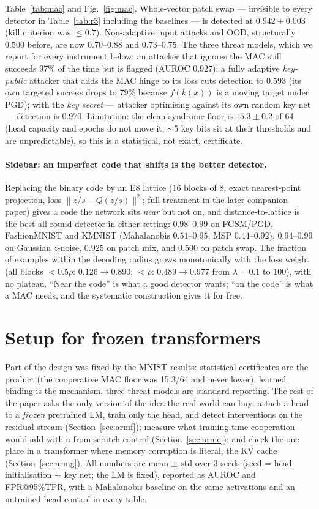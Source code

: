 \documentclass[10pt,twocolumn]{article}
\begin{document}
Table~\ref{tab:mac} and Fig.~\ref{fig:mac}. Whole-vector patch swap --- invisible to
every detector in Table~\ref{tab:r3} including the baselines --- is detected at
$0.942\pm0.003$ (kill criterion was $\le0.7$). Non-adaptive input attacks and OOD,
structurally $0.500$ before, are now $0.70$--$0.88$ and $0.73$--$0.75$. The three
threat models, which we report for every instrument below: an attacker that ignores
the MAC still succeeds 97\% of the time but is flagged (AUROC $0.927$); a fully
adaptive \emph{key-public} attacker that adds the MAC hinge to its loss cuts detection
to $0.593$ (its own targeted success drops to 79\% because $f(k(x))$ is a moving target
under PGD); with the \emph{key secret} --- attacker optimising against its own random
key net --- detection is $0.970$. Limitation: the clean syndrome floor is
$15.3\pm0.2$ of 64 (head capacity and epochs do not move it; $\sim$5 key bits sit at
their thresholds and are unpredictable), so this is a statistical, not exact,
certificate.

\paragraph{Sidebar: an imperfect code that shifts is the better detector.} Replacing
the binary code by an E8 lattice (16 blocks of 8, exact nearest-point projection,
loss $\|z/s-Q(z/s)\|^2$; full treatment in the later companion paper) gives a code the network
sits \emph{near} but not on, and distance-to-lattice is the best all-round detector
in either setting: $0.98$--$0.99$ on FGSM/PGD, FashionMNIST and KMNIST (Mahalanobis
$0.51$--$0.95$, MSP $0.44$--$0.92$), $0.94$--$0.99$ on Gaussian $z$-noise, $0.925$ on
patch mix, and $0.500$ on patch swap. The fraction of examples within the decoding
radius grows monotonically with the loss weight (all blocks $<0.5\rho$: $0.126\to0.890$;
$<\rho$: $0.489\to0.977$ from $\lambda{=}0.1$ to $100$), with no plateau. ``Near the
code'' is what a good detector wants; ``on the code'' is what a MAC needs, and the
systematic construction gives it for free.

\section{Setup for frozen transformers}\label{sec:setup}
Part of the design was fixed by the MNIST results: statistical certificates are the
product (the cooperative MAC floor was 15.3/64 and never lower), learned binding is
the mechanism, three threat models are standard reporting. The rest of the paper asks
the only version of the idea the real world can buy: attach a head to a \emph{frozen}
pretrained LM, train only the head, and detect interventions on the residual stream
(Section~\ref{sec:armf}); measure what training-time cooperation would add with a
from-scratch control (Section~\ref{sec:arme}); and check the one place in a
transformer where memory corruption is literal, the KV cache (Section~\ref{sec:armg}).
All numbers are mean $\pm$ std over 3 seeds (seed = head initialisation + key net; the
LM is fixed), reported as AUROC and FPR@95\%TPR, with a Mahalanobis baseline on the
same activations and an untrained-head control in every table.
\end{document}
